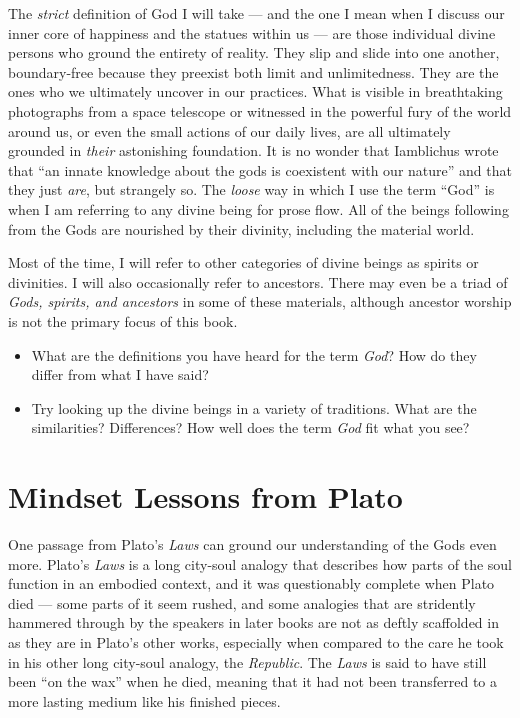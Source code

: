 \documentclass[
]{book}
\begin{document}
The \emph{strict} definition of God I will take --- and the one I mean when I discuss our inner core of happiness and the statues within us --- are those individual divine persons who ground the entirety of reality. They slip and slide into one another, boundary-free because they preexist both limit and unlimitedness. They are the ones who we ultimately uncover in our practices. What is visible in breathtaking photographs from a space telescope or witnessed in the powerful fury of the world around us, or even the small actions of our daily lives, are all ultimately grounded in \emph{their} astonishing foundation. It is no wonder that Iamblichus wrote that ``an innate knowledge about the gods is coexistent with our nature'' and that they just \emph{are}, but strangely so. The \emph{loose} way in which I use the term ``God'' is when I am referring to any divine being for prose flow. All of the beings following from the Gods are nourished by their divinity, including the material world.

Most of the time, I will refer to other categories of divine beings as spirits or divinities. I will also occasionally refer to ancestors. There may even be a triad of \emph{Gods, spirits, and ancestors} in some of these materials, although ancestor worship is not the primary focus of this book.

\begin{itemize}
\item
  What are the definitions you have heard for the term \emph{God}? How do they differ from what I have said?
\item
  Try looking up the divine beings in a variety of traditions. What are the similarities? Differences? How well does the term \emph{God} fit what you see?
\end{itemize}

\hypertarget{mindset-lessons-from-plato}{%
\section{Mindset Lessons from Plato}\label{mindset-lessons-from-plato}}

One passage from Plato's \emph{Laws} can ground our understanding of the Gods even more. Plato's \emph{Laws} is a long city-soul analogy that describes how parts of the soul function in an embodied context, and it was questionably complete when Plato died --- some parts of it seem rushed, and some analogies that are stridently hammered through by the speakers in later books are not as deftly scaffolded in as they are in Plato's other works, especially when compared to the care he took in his other long city-soul analogy, the \emph{Republic}. The \emph{Laws} is said to have still been ``on the wax'' when he died, meaning that it had not been transferred to a more lasting medium like his finished pieces.
\end{document}
